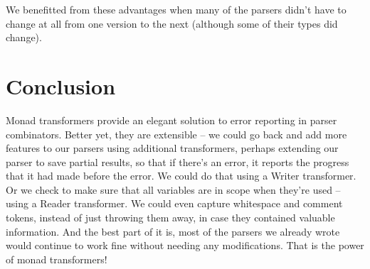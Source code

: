 \documentclass{tmr}
\begin{document}
We benefitted from these advantages when many of the parsers didn't have to change 
at all from one version to the next (although some of their types did change).




\section{Conclusion}
Monad transformers provide an elegant solution to error reporting in parser
combinators.  Better yet, they are extensible -- we could go back and add more
features to our parsers using additional transformers, perhaps extending our
parser to save partial results, so that if there's an error, it reports the
progress that it had made before the error.  We could do that using a Writer
transformer.  Or we check to make sure that all variables are in scope when
they're used -- using a Reader transformer.  We could even capture whitespace
and comment tokens, instead of just throwing them away, in case they contained
valuable information.  And the best part of it is, most of the parsers we already
wrote would continue to work fine without needing any modifications.  That
is the power of monad transformers!





\end{document}
